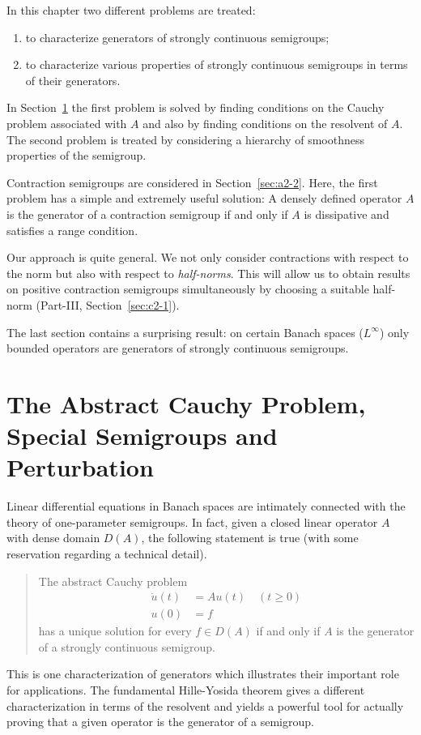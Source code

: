 \setcounter{section}{0}
\label{chap:a2}
\thispagestyle{empty}%
In this chapter two different problems are treated:
\begin{enumerate}[\upshape (i)]
\item 
to characterize generators of strongly continuous semigroups;
\item 
to characterize various properties of strongly continuous semigroups in terms of their generators.
\end{enumerate}
In Section~\ref{sec:a2-1} the first problem is solved by finding conditions on the Cauchy problem associated with $A$ and also by finding conditions on the resolvent of\/ $A$.
The second problem is treated by considering a hierarchy of smoothness properties of the semigroup.

Contraction semigroups are considered in Section~\ref{sec:a2-2}.
Here, the first problem has a simple and extremely useful solution: A densely defined operator $A$ is the generator of a contraction semigroup if and only if\/ $A$ is dissipative and satisfies a range condition.

Our approach is quite general.
We not only consider contractions with respect to the norm but also with respect to \emph{half-norms}.
This will allow us to obtain results on positive contraction semigroups simultaneously by choosing a suitable half-norm (\cf Part-III, Section~\ref{sec:c2-1}).

The last section contains a surprising result: on certain Banach spaces (\eg $L^{\infty}$) only bounded operators are generators of strongly continuous semigroups.
\section{The Abstract Cauchy Problem, Special Semigroups and Perturbation} \label{sec:a2-1}%
\hspace{1cm}{\Large by Wolfgang Arendt}
\vspace{.5cm}
\newline
Linear differential equations in Banach spaces are intimately connected with the theory of one-parameter semigroups.
In fact, given a closed linear operator $A$ with dense domain $D(A)$, the following statement is true (with some reservation regarding a technical detail).
\begin{quote}
The abstract Cauchy problem
\begin{align*}
	\dot{u}(t) &= Au(t) \quad (t \geq 0) \\
	u(0) &= f 
\end{align*}
has a unique solution for every $f \in D(A)$ if and only if\/ $A$ is the generator of a strongly continuous semigroup.
\end{quote}
This is one characterization of generators which illustrates their important role for applications.
The fundamental Hille-Yosida theorem gives a different characterization in terms of the resolvent and yields a powerful tool for actually proving that a given operator is the generator of a semigroup.

